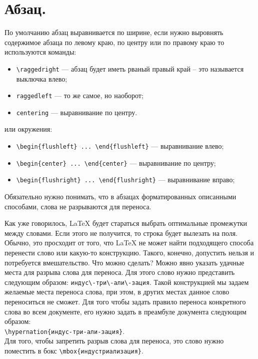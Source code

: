 \section{Абзац.}
По умолчанию абзац выравнивается по ширине, если нужно выровнять содержимое абзаца по
левому краю, по центру или по правому краю то используются команды:
\begin{itemize}
\item \verb|\raggedright| --- абзац будет иметь рваный правый край -- это называется
выключка влево;
\item \verb|raggedleft| --- то же самое, но наоборот;
\item \verb|centering| --- выравнивание по центру.
\end{itemize}
или окружения:
\begin{itemize}
\item \verb|\begin{flushleft} ... \end{flushleft}| --- выравнивание влево;
\item \verb|\begin{center} ... \end{center}| --- выравнивание по центру;
\item \verb|\begin{flushright} ... \end{flushright}| --- выравнивание вправо;
\end{itemize}
Обязательно нужно понимать, что в абзацах форматированных описанными способами, слова 
не разрываются для переноса.

Как уже говорилось, \LaTeX{} будет стараться выбрать оптимальные промежутки между 
словами. Если этого не получится, то строка будет вылезать на поля. Обычно, это 
просходит от того, что \LaTeX{} не может найти подходящего способа перенести слово или
какую-то конструкцию. Такого, конечно, допустить нельзя и потребуется вмешательство. 
Что можно сделать? Можно явно указать удачные места для разрыва слова для переноса. 
Для этого слово нужно представить следующим образом: \verb|индус\-три\-али\-зация|. 
Такой конструкцией мы задаем желаемые места переноса слова, при этом, в других местах 
данное слово переноситься не сможет. Для того чтобы задать правило переноса конкретного
слова во всем документе, его нужно задать в преамбуле документа следующим образом:\\
\verb|\hypernation{индус-три-али-зация}|.\\
Для того, чтобы запретить разрыв слова для переноса, это слово нужно поместить в бокс
\verb|\mbox{индустриализация}|.

